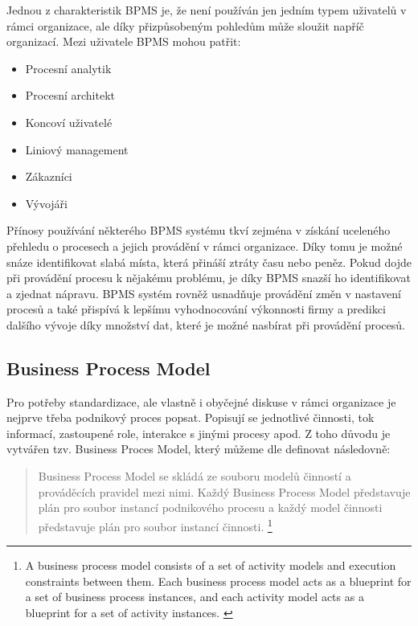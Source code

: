 \documentclass[]{article}
\begin{document}
Jednou z charakteristik BPMS je, že není používán jen jedním typem uživatelů v rámci organizace, ale díky přizpůsobeným pohledům může sloužit napříč organizací. Mezi uživatele BPMS mohou patřit: \cite{Naplava2015}

\begin{itemize}
\item Procesní analytik
\item Procesní architekt
\item Koncoví uživatelé
\item Liniový management
\item Zákazníci
\item Vývojáři
\end{itemize}

Přínosy používání některého BPMS systému tkví zejména v získání uceleného přehledu o procesech a jejich provádění v rámci organizace. Díky tomu je možné snáze identifikovat slabá místa, která přináší ztráty času nebo peněz. Pokud dojde při provádění procesu k nějakému problému, je díky BPMS snazší ho identifikovat a zjednat nápravu. BPMS systém rovněž usnadňuje provádění změn v nastavení procesů a také přispívá k lepšímu vyhodnocování výkonnosti firmy a predikci dalšího vývoje díky množství dat, které je možné nasbírat při provádění procesů.

\subsection{Business Process Model}
Pro potřeby standardizace, ale vlastně i obyčejné diskuse v rámci organizace je nejprve třeba podnikový proces popsat. Popisují se jednotlivé činnosti, tok informací, zastoupené role, interakce s jinými procesy apod. Z toho důvodu je vytvářen tzv. Business Proces Model, který můžeme dle \cite{Weske2007} definovat následovně:

\begin{quote}
Business Process Model se skládá ze souboru modelů činností a prováděcích pravidel mezi nimi. Každý Business Process Model představuje plán pro soubor instancí podnikového procesu a každý model činnosti představuje plán pro soubor instancí činnosti.
\footnote{A business process model consists of a set of activity models and execution constraints between them. Each business process model acts as a blueprint for a set of business process instances, and each activity model acts as a blueprint for a set of activity instances. \cite{Weske2007}}
\end{quote}
\end{document}
